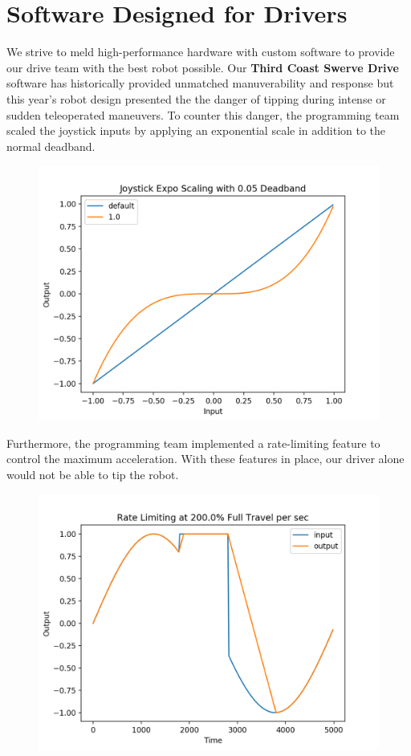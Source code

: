 \documentclass[10pt,tumble]{leaflet}
\begin{document}
\section{Software Designed for Drivers}
We strive to meld high-performance hardware with custom software to provide our drive team with the best robot possible. Our \textbf{Third Coast Swerve Drive} software has historically provided unmatched manuverability and response but this year's robot design presented the the danger of tipping during intense or sudden teleoperated maneuvers. To counter this danger, the programming team scaled the joystick inputs by applying an exponential scale in addition to the normal deadband.

\begin{figure}[H]
 \centering
 \includegraphics[scale=0.1]{assets/expo}
\end{figure}

Furthermore, the programming team implemented a rate-limiting feature to control the maximum acceleration.  With these features in place, our driver alone would not be able to tip the robot.

\begin{figure}[H]
 \centering
 \includegraphics[scale=0.1]{assets/rate}
\end{figure}
\end{document}
